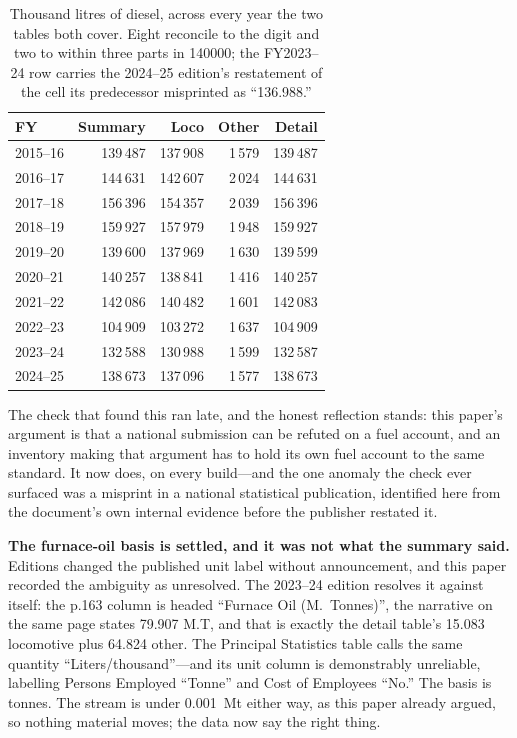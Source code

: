 \begin{table}[htbp]
\centering
\footnotesize
\begin{tabular}{@{}lrrrr@{}}
\toprule
\textbf{FY} & \textbf{Summary} & \textbf{Loco} & \textbf{Other} & \textbf{Detail} \\
\midrule
2015--16 & 139\,487 & 137\,908 & 1\,579 & 139\,487 \\
2016--17 & 144\,631 & 142\,607 & 2\,024 & 144\,631 \\
2017--18 & 156\,396 & 154\,357 & 2\,039 & 156\,396 \\
2018--19 & 159\,927 & 157\,979 & 1\,948 & 159\,927 \\
2019--20 & 139\,600 & 137\,969 & 1\,630 & 139\,599 \\
2020--21 & 140\,257 & 138\,841 & 1\,416 & 140\,257 \\
2021--22 & 142\,086 & 140\,482 & 1\,601 & 142\,083 \\
2022--23 & 104\,909 & 103\,272 & 1\,637 & 104\,909 \\
2023--24 & 132\,588 & 130\,988 & 1\,599 & 132\,587 \\
2024--25 & 138\,673 & 137\,096 & 1\,577 & 138\,673 \\
\bottomrule
\end{tabular}
\caption{Thousand litres of diesel, across every year the two tables both cover. Eight
reconcile to the digit and two to within three parts in \num{140000}; the FY2023--24 row
carries the 2024--25 edition's restatement of the cell its predecessor misprinted as
``136.988.''}
\label{tab:yearbook}
\end{table}

The check that found this ran late, and the honest reflection stands: this paper's argument
is that a national submission can be refuted on a fuel account, and an inventory making that
argument has to hold its own fuel account to the same standard. It now does, on every
build---and the one anomaly the check ever surfaced was a misprint in a national statistical
publication, identified here from the document's own internal evidence before the publisher
restated it.

\textbf{The furnace-oil basis is settled, and it was not what the summary said.} Editions
changed the published unit label without announcement, and this paper recorded the ambiguity as
unresolved. The 2023--24 edition resolves it against itself: the p.163 column is headed
``Furnace Oil (M.~Tonnes)'', the narrative on the same page states \SI{79.907}{} M.T, and that
is exactly the detail table's \num{15.083} locomotive plus \num{64.824} other. The Principal
Statistics table calls the same quantity ``Liters/thousand''---and its unit column is
demonstrably unreliable, labelling Persons Employed ``Tonne'' and Cost of Employees ``No.'' The
basis is tonnes. The stream is under \SI{0.001}{\mega\tonne} either way, as this paper already
argued, so nothing material moves; the data now say the right thing.

